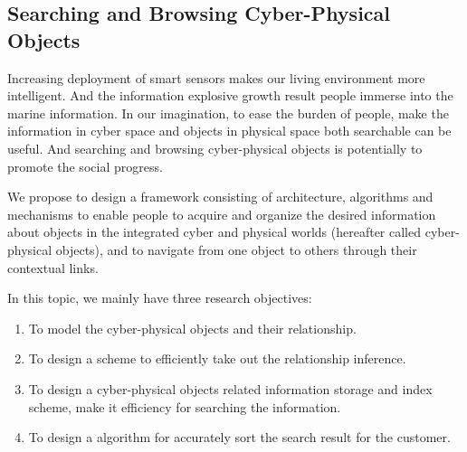 
\subsection{Searching and Browsing Cyber-Physical Objects}

Increasing deployment of smart sensors makes our living environment more intelligent. And the information explosive growth result people immerse into the marine information. In our imagination, to ease the burden of people, make the information in cyber space and objects in physical space both searchable can be useful. And searching and browsing cyber-physical objects is potentially to promote the social progress.

We propose to design a framework consisting of architecture, algorithms and mechanisms to enable people to acquire and organize the desired information about objects in the integrated cyber and physical worlds (hereafter called cyber-physical objects), and to navigate from one object to others through their contextual links.

In this topic, we mainly have three research objectives:

\begin{enumerate}
  \item To model the cyber-physical objects and their relationship.
  \item To design a scheme to efficiently take out the relationship inference.
  \item To design a cyber-physical objects related information storage and index scheme, make it efficiency for searching the information.
  \item To design a algorithm for accurately sort the search result for the customer.
\end{enumerate}





